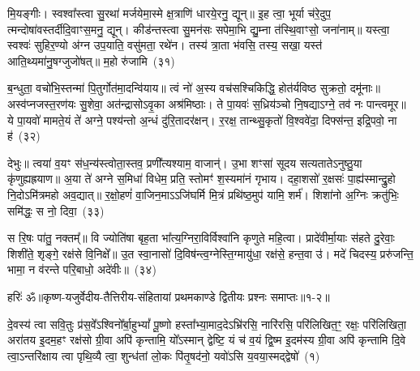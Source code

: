 मि॒यङ्गीः। स्वश्वा᳚स्त्वा सु॒रथा॑ मर्जयेमा॒स्मे क्ष॒त्राणि॑ धारये॒रनु॒ द्यून्॥ इ॒ह त्वा॒ भूर्या च॑रे॒दुप॒ त्मन्दोषा॑वस्तर्दीदि॒वाꣳ\-स॒मनु॒ द्यून्। कीड॑न्तस्त्वा सु॒मन॑सः सपेमा॒भि द्यु॒म्ना त॑स्थि॒वाꣳसो॒ जना॑नाम्॥ यस्त्वा॒ स्वश्वः॑ सुहिर॒ण्यो अ॑ग्न उप॒याति॒ वसु॑मता॒ रथे॑न। तस्य॑ त्रा॒ता भ॑वसि॒ तस्य॒ सखा॒ यस्त॑ आति॒थ्यमा॑नु॒षग्जुजो॑षत्॥ म॒हो रु॑जामि~(३१)\ip

ब॒न्धुता॒ वचो॑भि॒स्तन्मा॑ पि॒तुर्गोत॑मा॒दन्वि॑याय॥ त्वं नो॑ अ॒स्य वच॑सश्चिकिद्धि॒ होत॑र्यविष्ठ सुक्रतो॒ दमू॑नाः॥ अस्व॑प्नजस्त॒रण॑यः सु॒शेवा॒ अत॑न्द्रासो\-ऽवृ॒का अश्र॑मिष्ठाः। ते पा॒यवः॑ स॒ध्रिय॑ञ्चो नि॒षद्या\-ऽग्ने॒ तव॑ नः पान्त्वमूर॥ ये पा॒यवो॑ मामते॒यं ते॑ अग्ने॒ पश्य॑न्तो अ॒न्धं दु॑रि॒तादर॑क्षन्। र॒रक्ष॒ तान्थ्सु॒कृतो॑ वि॒श्ववे॑दा॒ दिफ्स॑न्त॒ इद्रि॒पवो॒ ना ह॑~(३२)\ip

देभुः॥ त्वया॑ व॒यꣳ स॑ध॒न्य॑स्त्वोता॒स्तव॒ प्रणी᳚त्यश्याम॒ वाजान्॑। उ॒भा शꣳसा॑ सूदय सत्यताते\-ऽनुष्ठु॒या कृ॑णुह्यह्रयाण॥ अ॒या ते॑ अग्ने स॒मिधा॑ विधेम॒ प्रति॒ स्तोमꣳ॑ श॒स्यमा॑नं गृभाय। दहा॒शसो॑ र॒क्षसः॑ पा॒ह्य॑स्मान्द्रु॒हो नि॒दो\-ऽमि॑त्रमहो अव॒द्यात्॥ र॒क्षो॒हणं॑ वा॒जिन॒मा\-ऽऽ\-जि॑घर्मि मि॒त्रं प्रथि॑ष्ठ॒मुप॑ यामि॒ शर्म॑। शिशा॑नो अ॒ग्निः क्रतु॑भिः॒ समि॑द्धः॒ स नो॒ दिवा॒~(३३)\ip

स रि॒षः पा॑तु॒ नक्तम्᳚॥ वि ज्योति॑षा बृह॒ता भा᳚त्य॒ग्निरा॒विर्विश्वा॑नि कृणुते महि॒त्वा। प्रादे॑वीर्मा॒याः स॑हते दु॒रेवाः॒ शिशी॑ते॒ शृङ्गे॒ रक्ष॑से वि॒निक्षे᳚॥ उ॒त स्वा॒नासो॑ दि॒विष॑न्त्व॒ग्नेस्ति॒ग्मायु॑धा॒ रक्ष॑से॒ हन्त॒वा उ॑। मदे॑ चिदस्य॒ प्ररु॑जन्ति॒ भामा॒ न व॑रन्ते परि॒बाधो॒ अदे॑वीः॥~(३४)\ip

{}

{हरिः॑ ॐ}{॥कृष्ण-यजुर्वेदीय-तैत्तिरीय-संहितायां प्रथमकाण्डे द्वितीयः प्रश्नः समाप्तः॥१-२॥}



\setcounter{anuvakam}{0}
दे॒वस्य॑ त्वा सवि॒तुः प्र॑स॒वे᳚\-ऽश्विनो᳚र्बा॒हु\-भ्यां᳚ पू॒ष्णो हस्ता᳚भ्या॒माद॒दे\-ऽभ्रि॑रसि॒ नारि॑रसि॒ परि॑लिखित॒ꣳ॒ रक्षः॒ परि॑लिखिता॒ अरा॑तय इ॒दम॒हꣳ रक्ष॑सो ग्री॒वा अपि॑ कृन्तामि॒ यो᳚\-ऽस्मान् द्वेष्टि॒ यं च॑ व॒यं द्वि॒ष्म इ॒दम॑स्य ग्री॒वा अपि॑ कृन्तामि दि॒वे त्वा॒\-ऽन्तरि॑क्षाय त्वा पृथि॒व्यै त्वा॒ शुन्ध॑तां लो॒कः पि॑तृ॒षद॑नो॒ यवो॑\-ऽसि य॒वया॒स्मद्द्वेषो॑~(१)\ip

